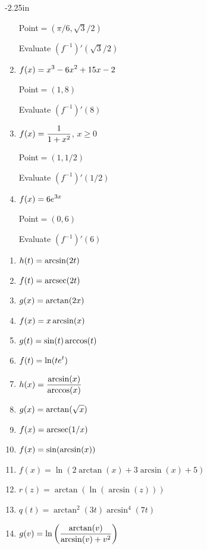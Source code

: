 \begin{adjustwidth*}{}{-2.25in}
\begin{multicols*}{2}
\begin{enumerate}[1),resume]
Point$=(\pi/6,\sqrt{3}/2)$ 

Evaluate $\left(f^{-1}\right)'(\sqrt{3}/2)$

\item $\displaystyle f(x) = x^3-6x^2+15x-2$

Point$=(1,8)$ 

Evaluate $\left(f^{-1}\right)'(8)$

\item $\displaystyle f(x) = \frac{1}{1+x^2}$, $x\geq 0$

Point$=(1,1/2)$ 

Evaluate $\left(f^{-1}\right)'(1/2)$

\item $\displaystyle f(x) = 6e^{3x}$

Point$=(0,6)$ 

Evaluate $\left(f^{-1}\right)'(6)$
\end{enumerate}


\begin{enumerate}[1),resume]
\item $\displaystyle h(t) = \arcsin(2t)$

\item $\displaystyle f(t) = \operatorname{arcsec}(2t)$

\item $\displaystyle g(x) = \arctan(2x)$

\item $\displaystyle f(x) = x \arcsin(x)$

\item $\displaystyle g(t) = \sin(t) \arccos(t)$

\item $\displaystyle f(t) = \ln(t e^t)$

\item $\displaystyle h(x) = \frac{\arcsin(x)}{\arccos(x)}$

\item $\displaystyle g(x) = \arctan(\sqrt{x})$

\item $\displaystyle f(x) = \operatorname{arcsec}(1/x)$

\item $\displaystyle f(x) = \sin(\arcsin(x))$

	\item $f(x) = \ln(2\arctan(x) + 3\arcsin(x) + 5)$
	\item $r(z) = \arctan(\ln(\arcsin(z)))$
	\item $q(t) = \arctan^2(3t) \arcsin^4(7t)$ 
	\item $\displaystyle g(v) =  \ln\left( \frac{\arctan(v)}{\arcsin(v) + v^2} \right)$
\end{enumerate}


\end{multicols*}
\end{adjustwidth*}
